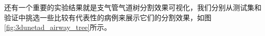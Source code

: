 还有一个重要的实验结果就是支气管气道树分割效果可视化，我们分别从测试集和验证中挑选一些比较有代表性的病例来展示它们的分割效果，如图
\ref{fig:3dunetad_airway_tree}所示。
